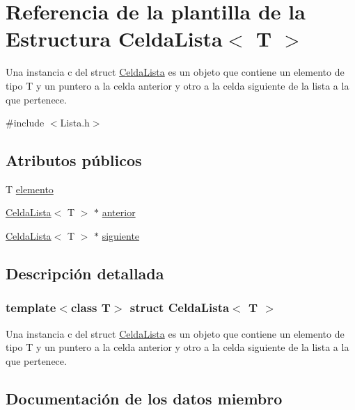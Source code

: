 \hypertarget{structCeldaLista}{}\section{Referencia de la plantilla de la Estructura Celda\+Lista$<$ T $>$}
\label{structCeldaLista}


Una instancia c del struct \mbox{\hyperlink{structCeldaLista}{Celda\+Lista}} es un objeto que contiene un elemento de tipo T y un puntero a la celda anterior y otro a la celda siguiente de la lista a la que pertenece.  




{\ttfamily \#include $<$Lista.\+h$>$}

\subsection*{Atributos públicos}
\begin{DoxyCompactItemize}
\item 
T \mbox{\hyperlink{structCeldaLista_ac78124efe37c55079de99a201c5a1b20}{elemento}}
\item 
\mbox{\hyperlink{structCeldaLista}{Celda\+Lista}}$<$ T $>$ $\ast$ \mbox{\hyperlink{structCeldaLista_af3e18d8970c86ba2bb1115ce157bf2e0}{anterior}}
\item 
\mbox{\hyperlink{structCeldaLista}{Celda\+Lista}}$<$ T $>$ $\ast$ \mbox{\hyperlink{structCeldaLista_aa3ce281ab57ddb597fe19a667f651d6a}{siguiente}}
\end{DoxyCompactItemize}


\subsection{Descripción detallada}
\subsubsection*{template$<$class T$>$\newline
struct Celda\+Lista$<$ T $>$}

Una instancia c del struct \mbox{\hyperlink{structCeldaLista}{Celda\+Lista}} es un objeto que contiene un elemento de tipo T y un puntero a la celda anterior y otro a la celda siguiente de la lista a la que pertenece. 

\subsection{Documentación de los datos miembro}
\mbox{\label{structCeldaLista_af3e18d8970c86ba2bb1115ce157bf2e0}} 
